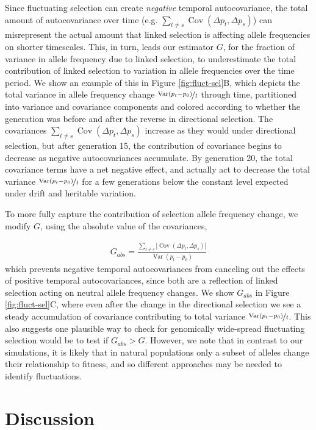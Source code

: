 \documentclass[11pt]{article}
\DeclareMathOperator{\var}{Var}
\DeclareMathOperator{\cov}{Cov}
\begin{document}
Since fluctuating selection can create \emph{negative} temporal autocovariance,
the total amount of autocovariance over time (e.g. $\sum_{t\ne s} \cov(\Delta
p_t, \Delta p_s)$) can misrepresent the actual amount that linked selection is
affecting allele frequencies on shorter timescales. This, in turn, leads our
estimator $G$, for the fraction of variance in allele frequency due to linked
selection, to underestimate the total contribution of linked selection to
variation in allele frequencies over the time period.  We show an example of
this in Figure \ref{fig:fluct-sel}B, which depicts the total variance in
allele frequency change $\nicefrac{\var(p_t - p_0)}{t}$ through time,
partitioned into variance and covariance components and colored according to
whether the generation was before and after the reverse in directional
selection. The covariances $\sum_{t\ne s} \cov(\Delta p_t, \Delta p_s)$
increase as they would under directional selection, but after generation 15,
the contribution of covariance begins to decrease as negative autocovariances
accumulate. By generation 20, the total covariance terms have a net negative
effect, and actually act to decrease the total variance $\nicefrac{\var(p_t -
p_0)}{t}$ for a few generations below the constant level expected under drift
and heritable variation.

To more fully capture the contribution of selection allele frequency change, we
modify $G$, using the absolute value of the covariances, 

\begin{align}
  G_{abs} = \frac{\sum_{t \ne s}|\cov(\Delta p_t, \Delta p_s)|}{\var(p_t - p_0)}
\end{align}
%
which prevents negative temporal autocovariances from canceling out the effects
of positive temporal autocovariances, since both are a reflection of linked
selection acting on neutral allele frequency changes. We show $G_{abs}$ in
Figure \ref{fig:fluct-sel}C, where even after the change in the directional
selection we see a steady accumulation of covariance contributing to total
variance $\nicefrac{\var(p_t - p_0)}{t}$. This also suggests one plausible way
to check for genomically wide-spread fluctuating selection would be to
test if $G_{abs} > G$. However, we note that in contrast to our
simulations, it is likely that in natural populations only a subset of
alleles change their relationship to fitness, and so different approaches may
be needed to identify fluctuations.

\section{Discussion}
\end{document}
